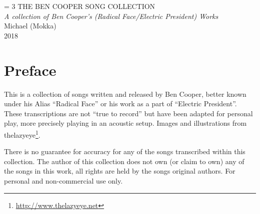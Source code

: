 \documentclass[sans, english]{songbook}
\begin{document}
 \frontmatter
 {\begingroup%
  \drop = 3\baselineskip
  \centering
  \vspace*{4cm}\null
  \vspace*{\drop}
  {\fontsize{45}{55}\selectfont THE BEN COOPER SONG COLLECTION}\\[2cm]
  {\Large\itshape A collection of Ben Cooper's (Radical Face/Electric President) Works}\\[1cm]
  \vfill
  {\Large Michael (Mokka)}\\
  \vspace*{\drop}
  {\scshape 2018}\par
  \vspace*{\drop}
 \endgroup}

 
 \maketoc
 \newpage
 \vspace*{1cm}
 
 \chapter*{Preface}
 
 \begin{spacing}{1.5}
 \fontsize{14}{16}\selectfont
  This is a collection of songs written and released by Ben Cooper, better known under his Alias ``Radical Face'' or his work as a part of ``Electric President''. These transcriptions are not ``true to record'' but have been adapted for personal play, more precisely playing in an acoustic setup. Images and illustrations from thelazyeye\footnote{\url{http://www.thelazyeye.net}}.\par There is no guarantee for accuracy for any of the songs transcribed within this collection. The author of this collection does not own (or claim to own) any of the songs in this work, all rights are held by the songs original authors. For personal and non-commercial use only.
 \end{spacing}
 
 \mainmatter
 
 
 \newpage
 
 
 
 
 
\end{document}
